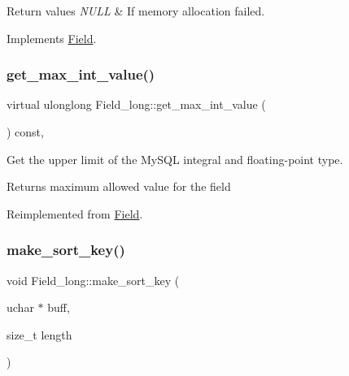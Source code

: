 \begin{DoxyRetVals}{Return values}
{\em N\+U\+LL} & If memory allocation failed. \\
\hline
\end{DoxyRetVals}


Implements \mbox{\hyperlink{classField_a01a9a9aa3a618941e839b1b8793c969d}{Field}}.

\mbox{\label{classField__long_aa28b8083eaced25f1c5e710af68eb44e}} 
\subsubsection{\texorpdfstring{get\+\_\+max\+\_\+int\+\_\+value()}{get\_max\_int\_value()}}
{\footnotesize\ttfamily virtual ulonglong Field\+\_\+long\+::get\+\_\+max\+\_\+int\+\_\+value (\begin{DoxyParamCaption}{ }\end{DoxyParamCaption}) const\hspace{0.3cm}{\ttfamily [inline]}, {\ttfamily [virtual]}}

Get the upper limit of the My\+S\+QL integral and floating-\/point type.

\begin{DoxyReturn}{Returns}
maximum allowed value for the field 
\end{DoxyReturn}


Reimplemented from \mbox{\hyperlink{classField_a22f18fbe3224a5ac4f23a90523b09087}{Field}}.

\mbox{\label{classField__long_a21a8a887e6a4adf89c90523d89a0fd02}} 
\subsubsection{\texorpdfstring{make\+\_\+sort\+\_\+key()}{make\_sort\_key()}}
{\footnotesize\ttfamily void Field\+\_\+long\+::make\+\_\+sort\+\_\+key (\begin{DoxyParamCaption}\item[{uchar $\ast$}]{buff,  }\item[{size\+\_\+t}]{length }\end{DoxyParamCaption})\hspace{0.3cm}{\ttfamily [virtual]}}

